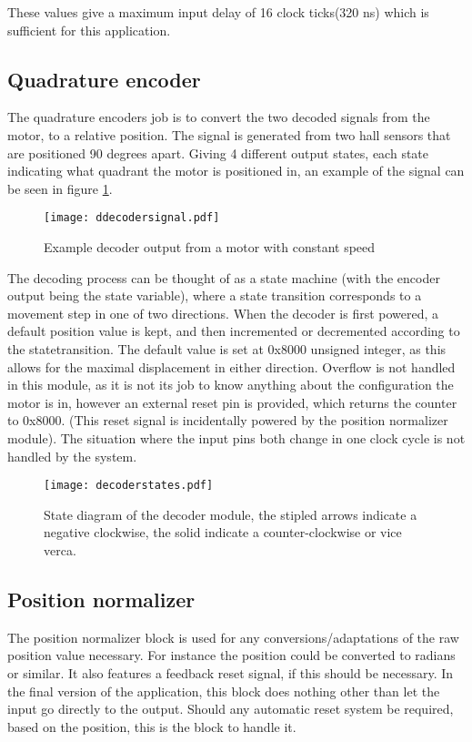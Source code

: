 These values give a maximum input delay of 16 clock ticks(320 ns) which is sufficient for this application.

\subsection{Quadrature encoder}
The quadrature encoders job is to convert the two decoded signals from the motor, to a relative position. The signal is generated from two hall sensors that are positioned 90 degrees apart. Giving 4 different output states, each state indicating what quadrant the motor is positioned in, an example of the signal can be seen in figure \ref{fig:decodersignal}.
\begin{figure}[htb]
\texttt{[image: ddecodersignal.pdf]}
\caption{Example decoder output from a motor with constant speed}
\label{fig:decodersignal}
\end{figure}
The decoding process can be thought of as a state machine (with the encoder output being the state variable), where a state transition corresponds to a movement step in one of two directions.
When the decoder is first powered, a default position value is kept, and then incremented or decremented according to the statetransition. The default value is set at 0x8000 unsigned integer, as this allows for the maximal displacement in either direction. 
Overflow is not handled in this module, as it is not its job to know anything about the configuration the motor is in, however an external reset pin is provided, which returns the counter to 0x8000. (This reset signal is incidentally powered by the position normalizer module).
The situation where the input pins both change in one clock cycle is not handled by the system.

\begin{figure}[htb]
\texttt{[image: decoderstates.pdf]}
\caption{State diagram of the decoder module, the stipled arrows indicate a negative clockwise, the solid indicate a counter-clockwise or vice verca.}
\label{fig:decoderstate}
\end{figure}

\subsection{Position normalizer}
The position normalizer block is used for any conversions/adaptations of the raw position value necessary. For instance the position could be converted to radians or similar. It also features a feedback reset signal, if this should be necessary. 
In the final version of the application, this block does nothing other than let the input go directly to the output.
Should any automatic reset system be required, based on the position, this is the block to handle it.

